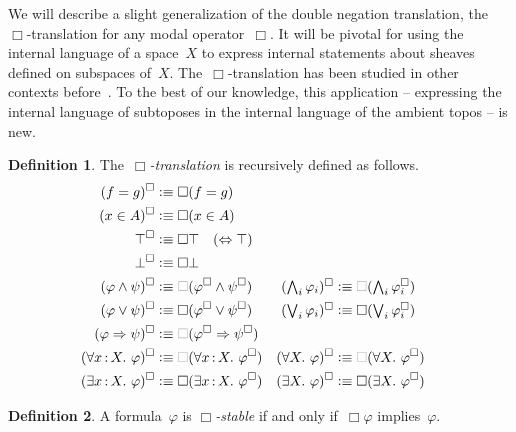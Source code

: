 \documentclass[10pt,reqno,a4paper]{amsbook}
\theoremstyle{definition}
\newtheorem{defn}{Definition}[section]
\theoremstyle{plain}
\theoremstyle{remark}
\newcommand{\?}{\,{:}\,}
\renewcommand{\_}{\mathpunct{.}\,}
\newcommand{\defequiv}{\vcentcolon\equiv}
\begin{document}
We will describe a slight generalization of the double negation translation,
the~$\Box$-translation for any modal operator~$\Box$. It will be pivotal
for using the internal language of a space~$X$ to express internal statements
about sheaves defined on subspaces of~$X$. The~$\Box$-translation has been studied
in other contexts
before~\cite{aczel:russell-prawitz,escardo:oliva:peirce-shift}. To the best of
our knowledge, this application -- expressing the internal language of
subtoposes in the internal language of the ambient topos -- is new.

\begin{defn}The~\emph{$\Box$-translation} is recursively defined as follows.
\newcommand{\optBox}{\textcolor{gray}{\Box}}
\begin{align*}
  (f = g)^\Box &\defequiv \Box(f = g) \\
  (x \in A)^\Box &\defequiv \Box(x \in A) \\
  \top^\Box &\defequiv \Box\top \quad \text{($\Leftrightarrow \top$)} \\
  \bot^\Box &\defequiv \Box\bot \\
  (\varphi \wedge \psi)^\Box &\defequiv \optBox(\varphi^\Box \wedge \psi^\Box) &
  \textstyle (\bigwedge_i \varphi_i)^\Box &\defequiv \textstyle \optBox(\bigwedge_i \varphi_i^\Box) \\
  (\varphi \vee \psi)^\Box &\defequiv \Box(\varphi^\Box \vee \psi^\Box) &
  \textstyle (\bigvee_i \varphi_i)^\Box &\defequiv \textstyle \Box(\bigvee_i \varphi_i^\Box) \\
  (\varphi \Rightarrow \psi)^\Box &\defequiv \optBox(\varphi^\Box \Rightarrow \psi^\Box) \\
  (\forall x\?X\_ \varphi)^\Box &\defequiv \optBox(\forall x\?X\_ \varphi^\Box) &
  (\forall X\_ \varphi)^\Box &\defequiv \optBox(\forall X\_ \varphi^\Box) \\
  (\exists x\?X\_ \varphi)^\Box &\defequiv \Box(\exists x\?X\_ \varphi^\Box) &
  (\exists X\_ \varphi)^\Box &\defequiv \Box(\exists X\_ \varphi^\Box)
\end{align*}
\end{defn}

\begin{defn}A formula~$\varphi$ is \emph{$\Box$-stable} if and only
if~$\Box\varphi$ implies~$\varphi$.\end{defn}
\end{document}
